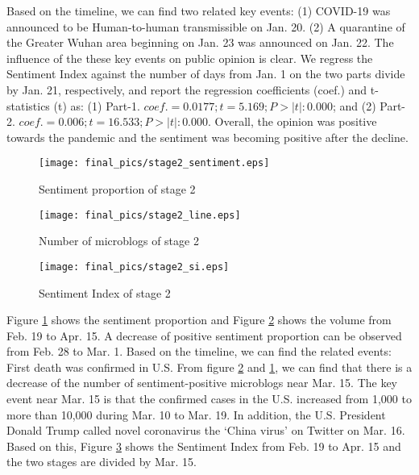 \documentclass[sigconf, nonacm=true]{acmart}
\begin{document}
Based on the timeline, we can find two related key events:
(1) COVID-19 was announced to be Human-to-human transmissible on Jan. 20.
(2) A quarantine of the Greater Wuhan area beginning on Jan. 23 was announced on Jan. 22.
The influence of the these key events on public opinion is clear.
We regress the Sentiment Index against the number of days from Jan. 1 on the two parts divide by Jan. 21,  respectively, and report the regression coefficients (coef.) and t-statistics (t) as:
(1) Part-1. $coef.= 0.0177; t=5.169;  P>|t|:0.000$; and 
(2) Part-2. $coef.= 0.006; t=16.533;  P>|t|:0.000$.
Overall, the opinion was positive towards the pandemic and the sentiment was becoming positive after the decline.

\begin{figure}[t]
  \texttt{[image: final\_pics/stage2\_sentiment.eps]}
  \vspace{-0.3cm}
  \caption{Sentiment proportion of stage 2}
  \vspace{-0.3cm}
  \label{figure:stage2_sentiment}
\end{figure}
\begin{figure}[t]
  \texttt{[image: final\_pics/stage2\_line.eps]}
  \vspace{-0.3cm}
  \caption{Number of microblogs of stage 2}
  \vspace{-0.3cm}
  \label{figure:stage2_line}
\end{figure}
\begin{figure}[t]
  \texttt{[image: final\_pics/stage2\_si.eps]}
  \vspace{-0.3cm}
  \caption{Sentiment Index of stage 2}
  \vspace{-0.3cm}
  \label{figure:stage2_si}
\end{figure}
Figure \ref{figure:stage2_sentiment} shows the sentiment proportion and Figure \ref{figure:stage2_line} shows the volume from Feb. 19 to Apr. 15.
A decrease of positive sentiment proportion can be observed from Feb. 28 to Mar. 1.
Based on the timeline, we can find the related events: First death was confirmed in U.S.
From figure \ref{figure:stage2_line} and \ref{figure:stage2_sentiment}, we can find that there is a decrease of the number of sentiment-positive microblogs near Mar. 15. 
The key event near Mar. 15 is that the confirmed cases in the U.S. increased from 1,000 to more than 10,000 during Mar. 10 to Mar. 19.
In addition, the U.S. President Donald Trump called novel coronavirus the `China virus' on Twitter on Mar. 16.
Based on this, Figure \ref{figure:stage2_si} shows the Sentiment Index from Feb. 19 to Apr. 15 and the two stages are divided by Mar. 15.
\end{document}
